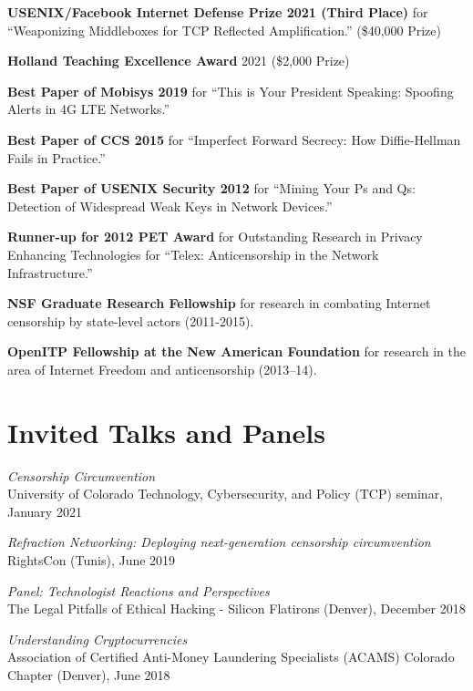 \documentclass[margin,11pt]{res} %
\begin{document}
    \textbf{USENIX/Facebook Internet Defense Prize 2021 (Third Place)}
    for ``Weaponizing Middleboxes for TCP Reflected Amplification.'' (\$40,000 Prize)

    \textbf{Holland Teaching Excellence Award} 2021 (\$2,000 Prize)

    \textbf{Best Paper of Mobisys 2019}
    for ``This is Your President Speaking: Spoofing Alerts in 4G LTE Networks.''

    \textbf{Best Paper of CCS 2015}
    for ``Imperfect Forward Secrecy: How Diffie-Hellman Fails in Practice.''

    \textbf{Best Paper of USENIX Security 2012}
    for ``Mining Your Ps and Qs: Detection of Widespread Weak Keys in Network Devices.''

    \textbf{Runner-up for 2012 PET Award} for Outstanding Research in Privacy Enhancing Technologies for ``Telex: Anticensorship in the Network Infrastructure.''


    \textbf{NSF Graduate Research Fellowship}
    for research in combating Internet censorship by state-level actors (2011-2015).
    
    \textbf{OpenITP Fellowship at the New American Foundation}
    for research in the area of Internet Freedom and anticensorship (2013--14).

\vspace{6pt}
\section{\large Invited Talks and Panels}

\emph{Censorship Circumvention} \\
    University of Colorado Technology, Cybersecurity, and Policy (TCP) seminar, January 2021

\emph{Refraction Networking: Deploying next-generation censorship circumvention} \\
    RightsCon (Tunis), June 2019

\emph{Panel: Technologist Reactions and Perspectives} \\
    The Legal Pitfalls of Ethical Hacking - Silicon Flatirons (Denver), December 2018

\emph{Understanding Cryptocurrencies} \\
    Association of Certified Anti-Money Laundering Specialists (ACAMS) Colorado Chapter (Denver), June 2018
\end{document}
